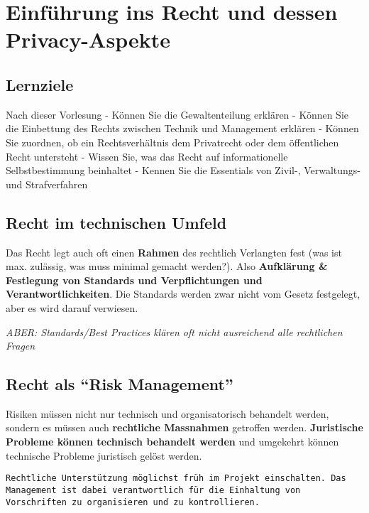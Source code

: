 \hypertarget{einfuxfchrung-ins-recht-und-dessen-privacy-aspekte}{%
\section{Einführung ins Recht und dessen
Privacy-Aspekte}\label{einfuxfchrung-ins-recht-und-dessen-privacy-aspekte}}

\hypertarget{lernziele}{%
\subsection{Lernziele}\label{lernziele}}

Nach dieser Vorlesung - Können Sie die Gewaltenteilung erklären - Können
Sie die Einbettung des Rechts zwischen Technik und Management erklären -
Können Sie zuordnen, ob ein Rechtsverhältnis dem Privatrecht oder dem
öffentlichen Recht untersteht - Wissen Sie, was das Recht auf
informationelle Selbstbestimmung beinhaltet - Kennen Sie die Essentials
von Zivil-, Verwaltungs- und Strafverfahren

\hypertarget{recht-im-technischen-umfeld}{%
\subsection{Recht im technischen
Umfeld}\label{recht-im-technischen-umfeld}}

Das Recht legt auch oft einen \textbf{Rahmen} des rechtlich Verlangten
fest (was ist max. zulässig, was muss minimal gemacht werden?). Also
\textbf{Aufklärung \& Festlegung von Standards und Verpflichtungen und
Verantwortlichkeiten}. Die Standards werden zwar nicht vom Gesetz
festgelegt, aber es wird darauf verwiesen.

\emph{ABER: Standards/Best Practices klären oft nicht ausreichend alle
rechtlichen Fragen}

\hypertarget{recht-als-risk-management}{%
\subsection{Recht als ``Risk
Management''}\label{recht-als-risk-management}}

Risiken müssen nicht nur technisch und organisatorisch behandelt werden,
sondern es müssen auch \textbf{rechtliche Massnahmen} getroffen werden.
\textbf{Juristische Probleme können technisch behandelt werden} und
umgekehrt können technische Probleme juristisch gelöst werden.

\begin{verbatim}
Rechtliche Unterstützung möglichst früh im Projekt einschalten. Das Management ist dabei verantwortlich für die Einhaltung von Vorschriften zu organisieren und zu kontrollieren. 
\end{verbatim}

